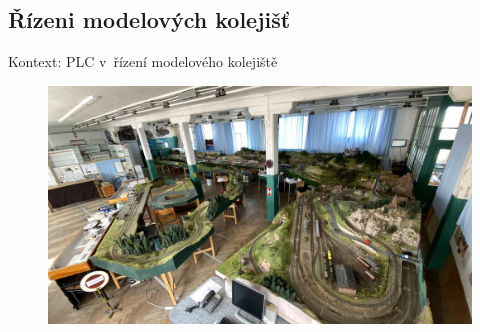 \documentclass[aspectratio=169]{beamer}
\begin{document}
\subsection{Řízeni modelových kolejišť}

\begin{frame}{Kontext: PLC v řízení modelového kolejiště}
\begin{figure}
\includegraphics[width=0.8\columnwidth]{data/kolejisteMosilana.jpg}
\end{figure}
\end{frame}

\end{document}
